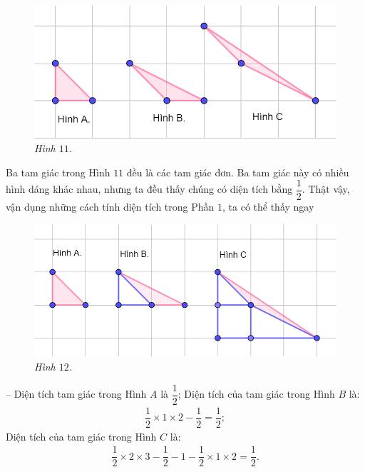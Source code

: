 \begin{multicols}{2}
\begin{figure}[H]
		\vspace*{-5pt}
		\centering
		\captionsetup{labelformat= empty, justification=centering}
		\includegraphics[width= 1\linewidth]{11}
		\caption{\small\textit{\color{toancuabi}Hình $11$.}}
		\vspace*{-10pt}
	\end{figure}
	Ba tam giác trong Hình $11$ đều là các tam giác đơn. Ba tam giác này có nhiều hình dáng khác nhau, nhưng ta đều thấy chúng có diện tích bằng $\dfrac{1}{2}$.
	Thật vậy, vận dụng những cách tính diện tích trong Phần $1$, ta có thể thấy ngay
	\begin{figure}[H]
		\vspace*{-5pt}
		\centering
		\captionsetup{labelformat= empty, justification=centering}
		\includegraphics[width= 1\linewidth]{12}
		\caption{\small\textit{\color{toancuabi}Hình $12$.}}
		\vspace*{-10pt}
	\end{figure}
	-- Diện tích tam giác trong Hình $A$ là $\dfrac{1}{2}$;
	\vskip 0.1cm
	Diện tích của tam giác trong Hình $B$ là: 
	\begin{align*}
		\dfrac{1}{2}\times 1\times 2 - \dfrac{1}{2} = \dfrac{1}{2};
	\end{align*}
	Diện tích của tam giác trong Hình $C$ là: 
	\begin{align*}
		\dfrac{1}{2}\times2\times3 - \dfrac{1}{2} - 1 - \dfrac{1}{2}\times1\times2 = \dfrac{1}{2}.

\end{align*}
\end{multicols}
